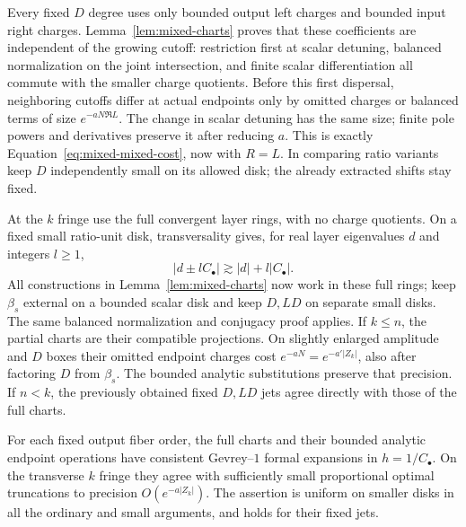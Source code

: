 Every fixed $D$ degree uses only bounded output left charges and
bounded input right charges. Lemma~\ref{lem:mixed-charts} proves
that these coefficients are independent of the growing cutoff:
restriction first at scalar detuning, balanced normalization on
the joint intersection, and finite scalar differentiation all
commute with the smaller charge quotients. Before this first
dispersal, neighboring cutoffs differ at actual endpoints only
by omitted charges or balanced terms of size
$e^{-aN\Re L}$. The change in scalar detuning has the same size;
finite pole powers and derivatives preserve it after reducing
$a$. This is exactly Equation~\eqref{eq:mixed-mixed-cost}, now
with $R=L$. In comparing ratio variants keep $D$ independently
small on its allowed disk; the already extracted shifts stay
fixed.

At the $k$ fringe use the full convergent layer rings, with no
charge quotients. On a fixed small ratio-unit disk, transversality
gives, for real layer eigenvalues $d$ and integers $l\geq1$,
\begin{equation}\label{eq:mixed-transversal}
 |d\pm lC_\bullet|\gtrsim |d|+l|C_\bullet|.
\end{equation}
All constructions in Lemma~\ref{lem:mixed-charts} now work in
these full rings; keep $\beta_s$ external on a bounded scalar
disk and keep $D,LD$ on separate small disks. The same balanced
normalization and conjugacy proof applies. If $k\leq n$, the
partial charts are their compatible projections. On slightly
enlarged amplitude and $D$ boxes their omitted endpoint charges
cost $e^{-aN}=e^{-a'|Z_k|}$, also after factoring $D$ from
$\beta_s$. The bounded analytic substitutions preserve that
precision. If $n<k$, the previously obtained fixed $D,LD$ jets
agree directly with those of the full charts.

\begin{lemma}\label{lem:mixed-fast-gevrey}
For each fixed output fiber order, the full charts and their
bounded analytic endpoint operations have consistent Gevrey--$1$
formal expansions in $h=1/C_\bullet$. On the transverse $k$
fringe they agree with sufficiently small proportional optimal
truncations to precision $O(e^{-a|Z_k|})$. The assertion is uniform
on smaller disks in all the ordinary and small arguments, and
holds for their fixed jets.
\end{lemma}

